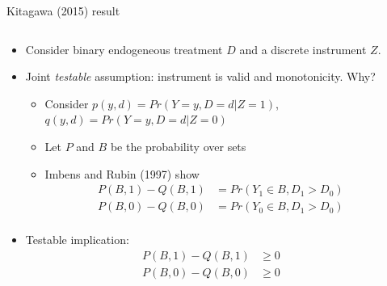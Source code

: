\documentclass[notes,11pt, aspectratio=169]{beamer}
\begin{document}
\begin{frame}{Kitagawa (2015) result}
  \begin{columns}[onlytextwidth, T] %
    \begin{column}{.5\textwidth}
      \begin{itemize}
      \item Consider binary endogeneous treatment $D$ and a discrete instrument $Z$.
      \item Joint \emph{testable} assumption: instrument is valid and monotonicity. Why?
        \begin{itemize}
        \item Consider $p(y,d) = Pr(Y = y, D = d | Z = 1)$, $q(y,d) = Pr(Y = y, D = d | Z = 0)$
        \item Let $P$ and $B$ be the probability over sets
        \item Imbens and Rubin (1997) show
          \vspace{-10pt}
          \begin{align*}
            P(B, 1) - Q(B,1) &= Pr(Y_{1} \in B, D_{1} > D_{0})\\
            P(B, 0) - Q(B,0) &= Pr(Y_{0} \in B, D_{1} > D_{0})\\                        
          \end{align*}
        \end{itemize}
        \vspace{-10pt}                
      \item Testable implication:
          \vspace{-10pt}        
          \begin{align*}
            P(B, 1) - Q(B,1) &\geq 0\\
            P(B, 0) - Q(B,0) &\geq 0
          \end{align*}
      \end{itemize}
    \end{column}%
    \hfill%
    \begin{column}{.5\textwidth}
    \end{column}%
  \end{columns}
\end{frame}
\end{document}
